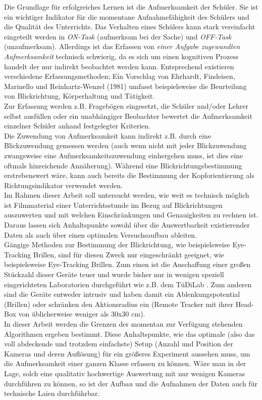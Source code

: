 \label{intension}
Die Grundlage für erfolgreiches Lernen ist die Aufmerksamkeit der Schüler. Sie ist ein wichtiger Indikator für die momentane Aufnahmefähigkeit des Schülers und die Qualität des Unterrichts. Das Verhalten eines Schülers kann stark vereinfacht eingeteilt werden in \textit{ON-Task} (aufmerksam bei der Sache) und \textit{OFF-Task} (unaufmerksam). Allerdings ist das Erfassen von \textit{einer Aufgabe zugewandten Aufmerksamkeit} technisch schwierig, da es sich um einen kognitiven Prozess handelt der nur indirekt beobachtet werden kann. Entsprechend existieren verschiedene Erfassungsmethoden; Ein Vorschlag von Ehrhardt, Findeisen, Marinello und Reinhartz-Wenzel (1981) umfasst beispielsweise die Beurteilung von Blickrichtung, Körperhaltung und Tätigkeit.\\
Zur Erfassung werden z.B. Fragebögen eingesetzt, die Schüler und/oder Lehrer selbst ausfüllen oder ein unabhängiger Beobachter bewertet die Aufmerksamkeit einzelner Schüler anhand festgelegter Kriterien.\\
Die Zuwendung von Aufmerksamkeit kann indirekt z.B. durch eine Blickzuwendung gemessen werden (auch wenn nicht mit jeder Blickzuwendung zwangsweise eine Aufmerksamkeitszuwendung einhergehen muss, ist dies eine oftmals hinreichende Annäherung). Während eine Blickrichtungsbestimmung erstrebenswert wäre, kann auch bereits die Bestimmung der Kopforientierung als Richtungsindikator verwendet werden.\\
Im Rahmen dieser Arbeit soll untersucht werden, wie weit es technisch möglich ist Filmmaterial einer Unterrichtsstunde im Bezug auf Blickrichtungen auszuwerten und mit welchen Einschränkungen und Genauigkeiten zu rechnen ist. Daraus lassen sich Anhaltspunkte sowohl über die Auswertbarkeit existierender Daten als auch über einen optimalen Versuchsaufbau ableiten.\\
Gängige Methoden zur Bestimmung der Blickrichtung, wie beispielsweise Eye-Tracking Brillen, sind für diesen Zweck nur eingeschränkt geeignet, wie beispielsweise Eye-Tracking Brillen. Zum einen ist die Anschaffung einer großen Stückzahl dieser Geräte teuer und wurde bisher nur in wenigen speziell eingerichteten Laboratorien durchgeführt wie z.B. dem TüDiLab \cite{TueDiLab}. Zum anderen sind die Geräte entweder intrusiv und haben damit ein Ablenkungspotential (Brillen) oder schränken den Aktionsradius ein (Remote Tracker mit ihrer Head-Box von üblicherweise weniger als 30x30 cm).\\
In dieser Arbeit werden die Grenzen der momentan zur Verfügung stehenden Algorithmen ergeben bestimmt. Diese Anhaltspunkte, wie das optimale (also das voll abdeckende und trotzdem einfachste) Setup (Anzahl und Position der Kameras und deren Auflösung) für ein größeres Experiment aussehen muss, um die Aufmerksamkeit einer ganzen Klasse erfassen zu können. Wäre man in der Lage, solch eine qualitativ hochwertige Auswertung mit nur wenigen Kameras durchführen zu können, so ist der Aufbau und die Aufnahmen der Daten auch für technische Laien durchführbar.\\
